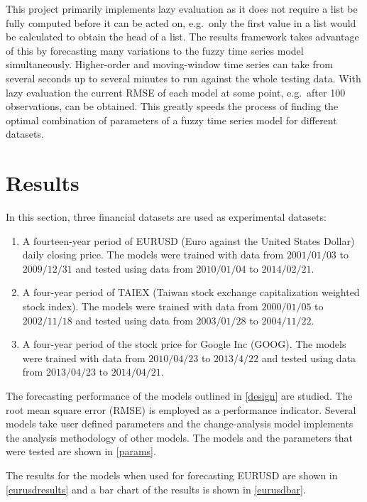 \documentclass[12pt, oneside, a4paper]{article}
\theoremstyle{definition}
\begin{document}
This project primarily implements lazy evaluation as it does not require a list be fully computed before it can be acted on, e.g.\ only the first value in a list would be calculated to obtain the head of a list. The results framework takes advantage of this by forecasting many variations to the fuzzy time series model simultaneously. Higher-order and moving-window time series can take from several seconds up to several minutes to run against the whole testing data. With lazy evaluation the current RMSE of each model at some point, e.g.\ after 100 observations, can be obtained. This greatly speeds the process of finding the optimal combination of parameters of a fuzzy time series model for different datasets.

\section{Results}

\label{results}

In this section, three financial datasets are used as experimental datasets:

\begin{enumerate}
\item A fourteen-year period of EURUSD (Euro against the United States Dollar) daily closing price. The models were trained with data from $2001/01/03$ to $2009/12/31$ and tested using data from $2010/01/04$ to $2014/02/21$.

\item A four-year period of TAIEX (Taiwan stock exchange capitalization weighted stock index). The models were trained with data from $2000/01/05$ to $2002/11/18$ and tested using data from $2003/01/28$ to $2004/11/22$. 

\item A four-year period of the stock price for Google Inc (GOOG). The models were trained with data from $2010/04/23$ to $2013/4/22$ and tested using data from $2013/04/23$ to $2014/04/21$.
\end{enumerate}

The forecasting performance of the models outlined in \cref{design} are studied. The root mean square error (RMSE) is employed as a performance indicator. Several models take user defined parameters and the change-analysis model implements the analysis methodology of other models. The models and the parameters that were tested are shown in \cref{params}.

The results for the models when used for forecasting EURUSD are shown in \cref{eurusdresults} and a bar chart of the results is shown in \cref{eurusdbar}. 
\end{document}
